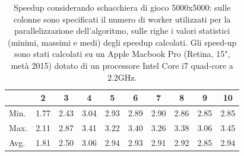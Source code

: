 ﻿\documentclass[a4paper]{article}
\begin{document}
\begin{table}[H]
\centering
\begin{tabular}{l|ccccccccc}
\hline
     & 2     & 3    & 4    & 5    & 6    & 7    & 8    & 9    & 10   \\ \hline
Min. & 1.77  & 2.43 & 3.04 & 2.93 & 2.89 & 2.90 & 2.86 & 2.85 & 2.85 \\
Max. & 2.11  & 2.87 & 3.41 & 3.22 & 3.40 & 3.26 & 3.38 & 3.06 & 3.45 \\
Avg. & 1.81  & 2.50 & 3.06 & 2.94 & 2.93 & 2.91 & 2.92 & 2.85 & 2.94 \\ \hline
\end{tabular}
\caption{Speedup considerando schacchiera di gioco 5000x5000: sulle colonne sono specificati il numero di worker utilizzati per la parallelizzazione dell'algoritmo, sulle righe i valori statistici (minimi, massimi e medi) degli speedup calcolati. Gli speed-up sono stati calcolati su un Apple Macbook Pro (Retina, 15", metà 2015) dotato di un processore Intel Core i7 quad-core a 2.2GHz.}
\label{Tabella speedup del sistema}
\end{table}

\end{document}
